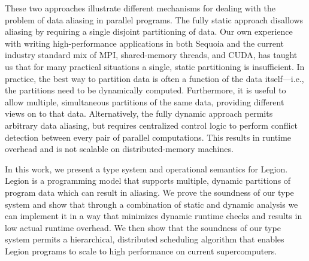 These two approaches illustrate different mechanisms for dealing with
the problem of data aliasing in parallel programs.  The fully static approach disallows aliasing
by requiring a single disjoint partitioning of data.  Our own experience with writing high-performance 
applications in both Sequoia and the current industry standard mix of MPI, shared-memory
threads, and CUDA, has taught us that for many practical situations a
single, static partitioning is insufficient.  In practice, the
best way to partition data is often a function of the data
itself---i.e., the partitions need to be dynamically computed.
Furthermore, it is useful to allow multiple, simultaneous partitions of
the same data, providing different views on to that data.  Alternatively, 
the fully dynamic approach permits arbitrary data aliasing, but requires 
centralized control logic to perform conflict detection between every pair 
of parallel computations. This results in runtime overhead and is 
not scalable on distributed-memory machines.

In this work, we present a type system and operational semantics for
Legion\cite{Legion12}.  Legion is a programming model that supports multiple,
dynamic partitions of program data which can result in aliasing.  We prove
the soundness of our type system and show that through a combination of
static and dynamic analysis we can implement it in a way that minimizes dynamic
runtime checks and results in low actual runtime overhead.  We then show 
that the soundness of our type system permits a hierarchical,
distributed scheduling algorithm that enables Legion programs to scale to 
high performance on current supercomputers.  

